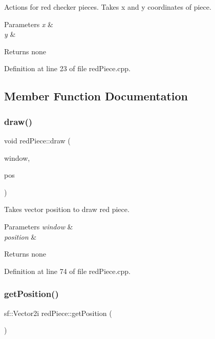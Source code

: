 Actions for red checker pieces. Takes x and y coordinates of piece.


\begin{DoxyParams}{Parameters}
{\em x} & \\
\hline
{\em y} & \\
\hline
\end{DoxyParams}
\begin{DoxyReturn}{Returns}
none 
\end{DoxyReturn}


Definition at line 23 of file red\+Piece.\+cpp.



\subsection{Member Function Documentation}
\mbox{\label{classred_piece_ad8150c1fd0b92e8e5e2a1e6261a78db1}} 
\subsubsection{\texorpdfstring{draw()}{draw()}}
{\footnotesize\ttfamily void red\+Piece\+::draw (\begin{DoxyParamCaption}\item[{sf\+::\+Render\+Window \&}]{window,  }\item[{sf\+::\+Vector2f}]{pos }\end{DoxyParamCaption})}

Takes vector position to draw red piece.


\begin{DoxyParams}{Parameters}
{\em window} & \\
\hline
{\em position} & \\
\hline
\end{DoxyParams}
\begin{DoxyReturn}{Returns}
none 
\end{DoxyReturn}


Definition at line 74 of file red\+Piece.\+cpp.

\mbox{\label{classred_piece_a1a707e1a60df9654c3158f97eaf0a22b}} 
\subsubsection{\texorpdfstring{getPosition()}{getPosition()}}
{\footnotesize\ttfamily sf\+::\+Vector2i red\+Piece\+::get\+Position (\begin{DoxyParamCaption}{ }\end{DoxyParamCaption})}

